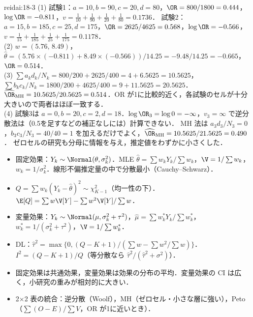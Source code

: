 \begin{kaitou}{reidai:18-3}
(1) 試験1：$a=10,b=90,c=20,d=80$，$\OR=800/1800=0.444$，$\log\OR=-0.811$，$v=\frac1{10}+\frac1{90}+\frac1{20}+\frac1{80}=0.1736$．
試験2：$a=15,b=185,c=25,d=175$，$\OR=2625/4625=0.568$，$\log\OR=-0.566$，$v=\frac1{15}+\frac1{185}+\frac1{25}+\frac1{175}=0.1178$．\\
(2) $w=(5.76,\,8.49)$，$\hat\theta=(5.76\times(-0.811)+8.49\times(-0.566))/14.25=-9.48/14.25=-0.665$，$\OR=0.514$．\\
(3) $\sum a_kd_k/N_k=800/200+2625/400=4+6.5625=10.5625$，$\sum b_kc_k/N_k=1800/200+4625/400=9+11.5625=20.5625$．
$\widehat\OR_{\mathrm{MH}}=10.5625/20.5625=0.514$．OR が1に比較的近く，各試験のセルが十分大きいので両者はほぼ一致する．\\
(4) 試験3は $a=0,b=20,c=2,d=18$．$\log\OR_3=\log0=-\infty$，$v_3=\infty$ で逆分散法は（0.5を足すなどの補正なしには）計算できない．
MH 法は $a_3d_3/N_3=0$，$b_3c_3/N_3=40/40=1$ を加えるだけでよく，$\widehat\OR_{\mathrm{MH}}=10.5625/21.5625=0.490$．
ゼロセルの研究も分母に情報を与え，推定値をわずかに小さくした．
\end{kaitou}

\begin{summarybox}
\begin{itemize}
\item 固定効果：$Y_k\sim\Normal(\theta,\sigma_k^2)$．MLE $\hat\theta=\sum w_kY_k/\sum w_k$，$\V=1/\sum w_k$，$w_k=1/\sigma_k^2$．線形不偏推定量の中で分散最小（Cauchy--Schwarz）．
\item $Q=\sum w_k(Y_k-\hat\theta)^2\sim\chi^2_{K-1}$（均一性の下）．$\E[Q]=\sum w\V[Y]-\sum w^2\V[Y]/\sum w$．
\item 変量効果：$Y_k\sim\Normal(\mu,\sigma_k^2+\tau^2)$，$\hat\mu=\sum w_k^*Y_k/\sum w_k^*$，$w_k^*=1/(\sigma_k^2+\tau^2)$，$\V=1/\sum w_k^*$．
\item DL：$\hat\tau^2=\max\{0,(Q-K+1)/(\sum w-\sum w^2/\sum w)\}$．$I^2=(Q-K+1)/Q$（等分散なら $\hat\tau^2/(\hat\tau^2+\sigma^2)$）．
\item 固定効果は共通効果，変量効果は効果の分布の平均．変量効果の CI は広く，小研究の重みが相対的に大きい．
\item 2×2 表の統合：逆分散（Woolf），MH（ゼロセル・小さな層に強い），Peto（$\sum(O-E)/\sum V$，OR が1に近いとき）．
\end{itemize}
\end{summarybox}
